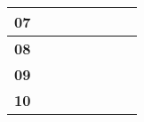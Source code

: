 \begin{table}[ht]
\begin{tabular}{|l|l|llll|l|l|}
    \textbf{07}                                                                 &                                                                                              & \multicolumn{1}{l|}{}                                   & \multicolumn{1}{l|}{}                                   & \multicolumn{1}{l|}{}                                   &                                                         &                                                                                                  &                                                                                                    \\ \hline
    \textbf{08}                                                                 &                                                                                              & \multicolumn{1}{l|}{}                                   & \multicolumn{1}{l|}{}                                   & \multicolumn{1}{l|}{}                                   &                                                         &                                                                                                  &                                                                                                    \\ \hline
    \textbf{09}                                                                 &                                                                                              & \multicolumn{1}{l|}{}                                   & \multicolumn{1}{l|}{}                                   & \multicolumn{1}{l|}{}                                   &                                                         &                                                                                                  &                                                                                                    \\ \hline
    \textbf{10}                                                                 &                                                                                              & \multicolumn{1}{l|}{}                                   & \multicolumn{1}{l|}{}                                   & \multicolumn{1}{l|}{}                                   &                                                         &                                                                                                  &                                                                                                    \\ \hline

\end{tabular}
\end{table}
